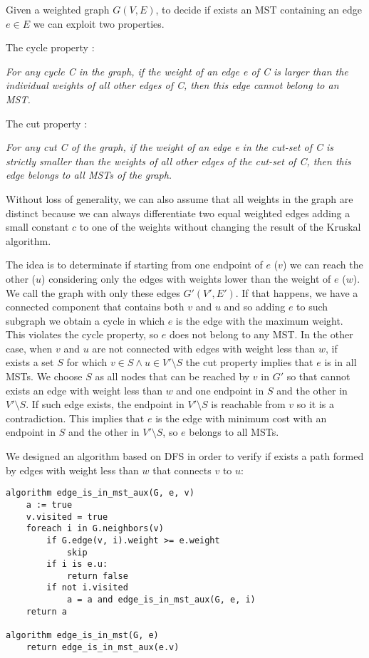 \documentclass[paper=a4, fontsize=11pt]{scrartcl} %
\numberwithin{equation}{section} %
\numberwithin{figure}{section} %
\numberwithin{table}{section} %
\begin{document}
Given a weighted graph $G(V, E)$, to decide if exists an MST containing an edge $e \in E$ we can exploit two properties.

The cycle property \cite{cicle_prop}:

\bigskip
{\em For any cycle C in the graph, if the weight of an edge e of C is larger than the individual weights of all other edges of C, then this edge cannot belong to an MST.} 
\bigskip

The cut property \cite{cut_prop}:

\bigskip
{\em For any cut C of the graph, if the weight of an edge e in the cut-set of C is strictly smaller than the weights of all other edges of the cut-set of C, then this edge belongs to all MSTs of the graph.} 
\bigskip

Without loss of generality, we can also assume that all weights in the graph are distinct because we can always differentiate two equal weighted edges adding a small constant $c$ to one of the weights without changing the result of the Kruskal algorithm.

The idea is to determinate if starting from one endpoint of $e$ ($v$) we can reach the other ($u$) considering only the edges with weights lower than the weight of $e$ ($w$).
We call the graph with only these edges $G'(V', E')$.
If that happens, we have a connected component that contains both $v$ and $u$ and so adding $e$ to such subgraph we obtain a cycle in which $e$ is the edge with the maximum weight. This violates the cycle property, so $e$ does not belong to any MST.
In the other case, when $v$ and $u$ are not connected with edges with weight less than $w$, if exists a set $S$ for which $v \in S \land u \in V' \setminus S$ the cut property implies that $e$ is in all MSTs.
We choose $S$ as all nodes that can be reached by $v$ in $G'$ so that cannot exists an edge with weight less than $w$ and one endpoint in $S$ and the other in $V' \setminus S$. If such edge exists, the endpoint in $V' \setminus S$ is reachable from $v$ so it is a contradiction.
This implies that $e$ is the edge with minimum cost with an endpoint in $S$ and the other in $V' \setminus S$, so $e$ belongs to all MSTs.

We designed an algorithm based on DFS in order to verify if exists a path formed by edges with weight less than $w$ that connects $v$ to $u$:

\begin{verbatim}
algorithm edge_is_in_mst_aux(G, e, v)
    a := true
    v.visited = true
    foreach i in G.neighbors(v)
        if G.edge(v, i).weight >= e.weight
            skip
        if i is e.u:
            return false
        if not i.visited
            a = a and edge_is_in_mst_aux(G, e, i)
    return a

algorithm edge_is_in_mst(G, e)
    return edge_is_in_mst_aux(e.v)
\end{verbatim}
\end{document}
